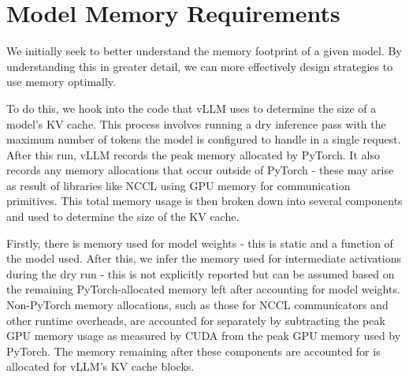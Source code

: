\documentclass[12pt,twoside]{report}
\begin{document}
\section{Model Memory Requirements}
\begin{comment}
  - Need to understand memory breakdown in order to better understand how it is allocated/what can be moved around
  - do this by hooking into vLLM's memory allocation code
    - explain how this works
      - runs a dry run with maximum number of tokens
      - sees peak allocated memory by torch, as well as non-torch allocated memory
      - breaks this down into model weights, activations (we assume), non-torch allocated memory (nccl communicators etc. )
      - the rest is allocated as kv cache memory
    - Speak about how number of available gpu blocks available is affected by number of kv heads per layers and the number of total layers
  - as we can see, varying the utilisation parameter only changes the amount of memory allocated for the kv cache 

  - speak about how block size varies
    - what determines block size
\end{comment}
We initially seek to better understand the memory footprint of a given model.
By understanding this in greater detail, we can more effectively design strategies to use memory optimally.

To do this, we hook into the code that vLLM uses to determine the size of a model's KV cache.
This process involves running a dry inference pass with the maximum number of tokens the model is configured to handle in a single request.
After this run, vLLM records the peak memory allocated by PyTorch.
It also records any memory allocations that occur outside of PyTorch - these may arise as result of libraries like NCCL using GPU memory for communication primitives.
This total memory usage is then broken down into several components and used to determine the size of the KV cache.

Firstly, there is memory used for model weights - this is static and a function of the model used.
After this, we infer the memory used for intermediate activations during the dry run - this is not explicitly reported but can be assumed based on the remaining PyTorch-allocated memory left after accounting for model weights.
Non-PyTorch memory allocations, such as those for NCCL communicators and other runtime overheads, are accounted for separately by subtracting the peak GPU memory usage as measured by CUDA from the peak GPU memory used by PyTorch.
The memory remaining after these components are accounted for is allocated for vLLM's KV cache blocks.
\end{document}
